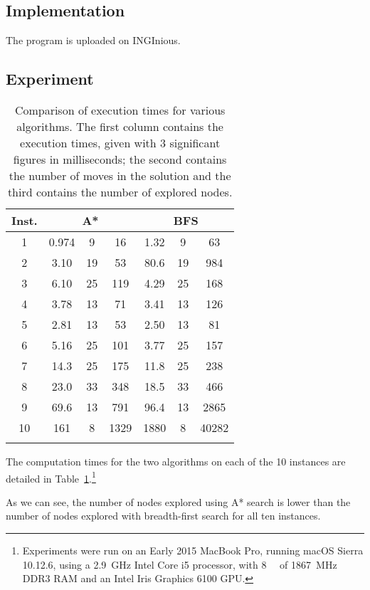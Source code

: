 \documentclass[journal]{IEEEtran}
\begin{document}
\subsection{Implementation}
The program is uploaded on INGInious.

\subsection{Experiment}
\begin{table}[!hbtp]
	\centering
	\begin{tabular}{c@{\hspace{0.7cm}}ccc|ccc} 
		\toprule
		Inst. & \multicolumn{3}{c}{A*} & \multicolumn{3}{c}{BFS} \\
		\midrule
		1 & 0.974 & 9 & 16  & 1.32 & 9 & 63 \\
		2 & 3.10 & 19 & 53 & 80.6 & 19 & 984 \\
		3 & 6.10 & 25 & 119 & 4.29 & 25 & 168 \\
		4 & 3.78 & 13 & 71 & 3.41 & 13 & 126 \\
		5 & 2.81 & 13 & 53 & 2.50 & 13 & 81 \\
		6 & 5.16 & 25 & 101 & 3.77 & 25 & 157 \\
		7 & 14.3 & 25 & 175 & 11.8 & 25 & 238 \\
		8 & 23.0 & 33 & 348 & 18.5 & 33 & 466 \\
		9 & 69.6 & 13 & 791  & 96.4 & 13 & 2865 \\
		10 & 161 & 8 & 1329 & 1880 & 8 & 40282 \\
		\bottomrule \\
	\end{tabular}
	\caption{Comparison of execution times for various algorithms.
		The first column contains the execution times, given with 3 significant figures in milliseconds; the second contains the number of moves in the solution and the third contains the number of explored nodes.}
	\label{time1}
\end{table}

 The computation times for the two algorithms on each of the 10 instances are detailed in Table~\ref{time1}.\footnote{Experiments were run on an Early 2015 MacBook Pro, running macOS Sierra 10.12.6, using a \SI{2.9}{\giga\hertz} Intel Core i5 processor, with \SI{8}{\giga\byte} of \SI{1867}{\mega\hertz} DDR3 RAM and an Intel Iris Graphics 6100 GPU.} 

As we can see, the number of nodes explored using A* search is lower than the number of nodes explored with breadth-first search for all ten instances.
\end{document}

